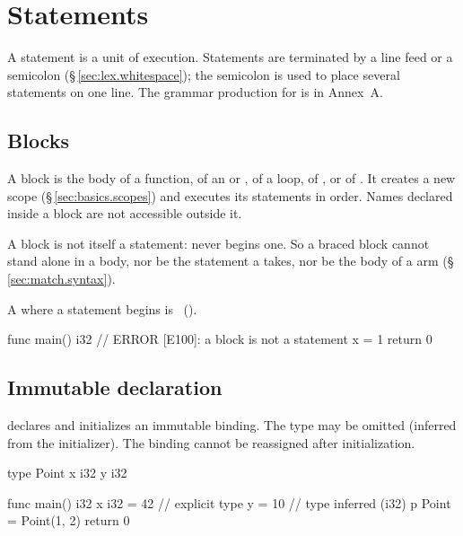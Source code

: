 \chapter{Statements}
\label{sec:09-statements}

\pnum
A statement is a unit of execution.  Statements are terminated by a line feed
or a semicolon (\S\,\ref{sec:lex.whitespace}); the semicolon is used to place
several statements on one line.  The grammar production for
 is in Annex~A.

\section{Blocks}
\label{sec:stmt.block}

\pnum
A block  is the body of a function, of an  or ,
of a loop, of , or of .  It creates a new scope
(\S\,\ref{sec:basics.scopes}) and executes its statements in order.  Names declared
inside a block are not accessible outside it.

\pnum
A block is not itself a statement: \lain{\{} never begins one.  So a braced block cannot
stand alone in a body, nor be the statement a  takes, nor be the body of a
 arm (\S\,\ref{sec:match.syntax}).

\begin{constraint}
  A \lain{\{} where a statement begins is \illformed{}~().
\end{constraint}

\begin{laincode}
func main() i32 {
    {                        // ERROR [E100]: a block is not a statement
        x = 1
    }
    return 0
}
\end{laincode}

\section{Immutable declaration}
\label{sec:stmt.decl}

\pnum
{} declares and initializes an immutable binding.
The type may be omitted (inferred from the initializer).  The binding
cannot be reassigned after initialization.

\begin{laincode}
type Point {
    x i32
    y i32
}

func main() i32 {
    x i32 = 42          // explicit type
    y = 10              // type inferred (i32)
    p Point = Point(1, 2)
    return 0
}
\end{laincode}

